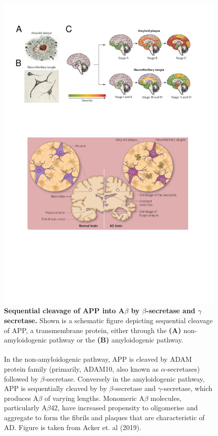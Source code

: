 \begin{figure}[!htp]
	\centering
	\includegraphics[page=2,trim={0.5cm 9cm 0cm 14.5cm},clip, scale = 0.8]{Figures/Introduction_Figures.pdf}
	\captionsetup{width=0.95\textwidth,singlelinecheck=off}
	\caption[Amyloid cascade hypothesis]%
	{\textbf{Sequential cleavage of APP into A$\beta$ by $\beta$-secretase and $\gamma$ secretase.} Shown is a schematic figure depicting sequential cleavage of APP, a transmembrane protein, either through the \textbf{(A)} non-amyloidogenic pathway or the \textbf{(B)} amyloidogenic pathway.
	\\
	\\
	In the non-amyloidogenic pathway, APP is cleaved by ADAM protein family (primarily, ADAM10, also known as $\alpha$-secretases) followed by $\beta$-secretase. Conversely in the amyloidogenic pathway, APP is sequentially cleaved by by $\beta$-secretase and $\gamma$-secretase, which produces A$\beta$ of varying lengths. Monomeric A$\beta$ molecules, particularly A$\beta$42, have increased propensity to oligomerise and aggregate to form the fibrils and plaques that are characteristic of AD. Figure is taken from Acker et. al (2019)\cite{Acker2019}. 
	}
	\label{fig:APP_Processing}
\end{figure}

